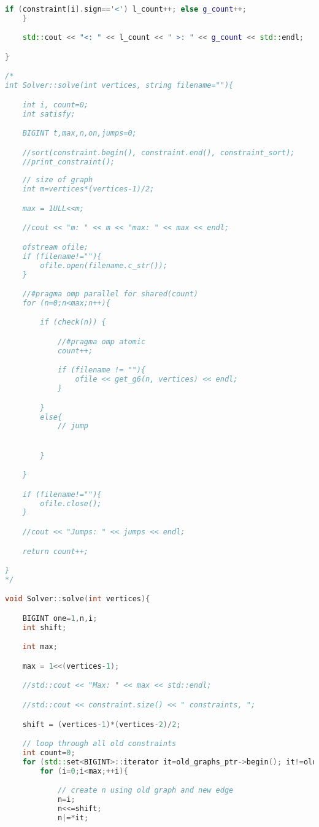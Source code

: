 \documentclass[12pt]{etsu_thesis}
\begin{document}
\begin{lstlisting}[language=C++]
        if (constraint[i].sign=='<') l_count++; else g_count++;
    }

    std::cout << "<: " << l_count << " >: " << g_count << std::endl;

}

/*
int Solver::solve(int vertices, string filename=""){

	int i, count=0;
	int satisfy;

	BIGINT t,max,n,on,jumps=0;

	//sort(constraint.begin(), constraint.end(), constraint_sort);
	//print_constraint();
	
	// size of graph
	int m=vertices*(vertices-1)/2;

	max = 1ULL<<m;

	//cout << "m: " << m << "max: " << max << endl;

	ofstream ofile;
	if (filename!=""){
		ofile.open(filename.c_str());
	}

	//#pragma omp parallel for shared(count)
	for (n=0;n<max;n++){

		if (check(n)) {

			//#pragma omp atomic
			count++;

			if (filename != ""){
				ofile << get_g6(n, vertices) << endl;
			}

		}
        else{
            // jump


        }

	}

	if (filename!=""){
		ofile.close();
	}	

	//cout << "Jumps: " << jumps << endl;

	return count++;

}
*/

void Solver::solve(int vertices){

    BIGINT one=1,n,i;
    int shift;

    int max;

    max = 1<<(vertices-1);

    //std::cout << "Max: " << max << std::endl;

    //std::cout << constraint.size() << " constraints, ";

    shift = (vertices-1)*(vertices-2)/2;

    // loop through all old constraints
    int count=0;
    for (std::set<BIGINT>::iterator it=old_graphs_ptr->begin(); it!=old_graphs_ptr->end(); ++it){
        for (i=0;i<max;++i){

            // create n using old graph and new edge
            n=i;
            n<<=shift;
            n|=*it;


\end{lstlisting}
\end{document}
